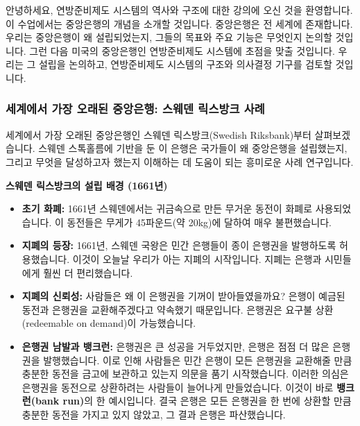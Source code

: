 \documentclass[11pt,a4paper]{book}
\theoremstyle{definition}
\begin{document}
안녕하세요, 연방준비제도 시스템의 역사와 구조에 대한 강의에 오신 것을 환영합니다. 이 수업에서는 중앙은행의 개념을 소개할 것입니다. 중앙은행은 전 세계에 존재합니다. 우리는 중앙은행이 왜 설립되었는지, 그들의 목표와 주요 기능은 무엇인지 논의할 것입니다. 그런 다음 미국의 중앙은행인 연방준비제도 시스템에 초점을 맞출 것입니다. 우리는 그 설립을 논의하고, 연방준비제도 시스템의 구조와 의사결정 기구를 검토할 것입니다.

\vspace{1em}

\subsubsection*{세계에서 가장 오래된 중앙은행: 스웨덴 릭스방크 사례}
세계에서 가장 오래된 중앙은행인 스웨덴 릭스방크(Swedish Riksbank)부터 살펴보겠습니다. 스웨덴 스톡홀름에 기반을 둔 이 은행은 국가들이 왜 중앙은행을 설립했는지, 그리고 무엇을 달성하고자 했는지 이해하는 데 도움이 되는 흥미로운 사례 연구입니다.

\begin{examplebox}
\textbf{스웨덴 릭스방크의 설립 배경 (1661년)}
\begin{itemize}
    \item \textbf{초기 화폐:} 1661년 스웨덴에서는 귀금속으로 만든 무거운 동전이 화폐로 사용되었습니다. 이 동전들은 무게가 45파운드(약 20kg)에 달하여 매우 불편했습니다.
    \item \textbf{지폐의 등장:} 1661년, 스웨덴 국왕은 민간 은행들이 종이 은행권을 발행하도록 허용했습니다. 이것이 오늘날 우리가 아는 지폐의 시작입니다. 지폐는 은행과 시민들에게 훨씬 더 편리했습니다.
    \item \textbf{지폐의 신뢰성:} 사람들은 왜 이 은행권을 기꺼이 받아들였을까요? 은행이 예금된 동전과 은행권을 교환해주겠다고 약속했기 때문입니다. 은행권은 요구불 상환(redeemable on demand)이 가능했습니다.
    \item \textbf{은행권 남발과 뱅크런:} 은행권은 큰 성공을 거두었지만, 은행은 점점 더 많은 은행권을 발행했습니다. 이로 인해 사람들은 민간 은행이 모든 은행권을 교환해줄 만큼 충분한 동전을 금고에 보관하고 있는지 의문을 품기 시작했습니다. 이러한 의심은 은행권을 동전으로 상환하려는 사람들이 늘어나게 만들었습니다. 이것이 바로 \textbf{뱅크런(bank run)}의 한 예시입니다. 결국 은행은 모든 은행권을 한 번에 상환할 만큼 충분한 동전을 가지고 있지 않았고, 그 결과 은행은 파산했습니다.
\end{itemize}
\end{examplebox}

\vspace{1em}
\end{document}

